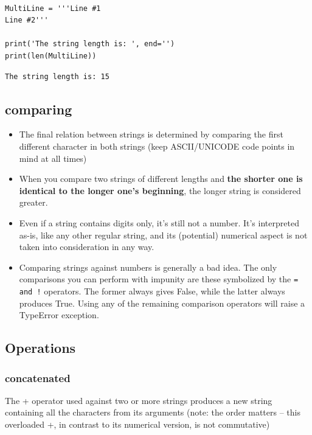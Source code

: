 \documentclass[11pt]{article}
\begin{document}
\begin{verbatim}

MultiLine = '''Line #1
Line #2'''

print('The string length is: ', end='')
print(len(MultiLine))

\end{verbatim}

\begin{verbatim}
The string length is: 15
\end{verbatim}

\subsection{comparing}
\label{sec:orgd43012f}
\begin{itemize}
\item The final relation between strings is determined by comparing the
first different character in both strings (keep ASCII/UNICODE code
points in mind at all times)
\item When you compare two strings of different lengths and \textbf{the shorter
one is identical to the longer one’s beginning}, the longer string is
considered greater.
\item Even if a string contains digits only, it’s still not a number. It’s
interpreted as-is, like any other regular string, and its
(potential) numerical aspect is not taken into consideration in any
way.
\item Comparing strings against numbers is generally a bad idea. The only
comparisons you can perform with impunity are these symbolized by
the \texttt{= and !} operators. The former always gives False, while the
latter always produces True. Using any of the remaining comparison
operators will raise a TypeError exception.
\end{itemize}

\newpage
\subsection{Operations}
\label{sec:orgf7aa69f}
\subsubsection{concatenated}
\label{sec:org29bde1e}
The + operator used against two or more strings produces a new string
containing all the characters from its arguments (note: the order
matters – this overloaded +, in contrast to its numerical version,
is not commutative)
\end{document}
